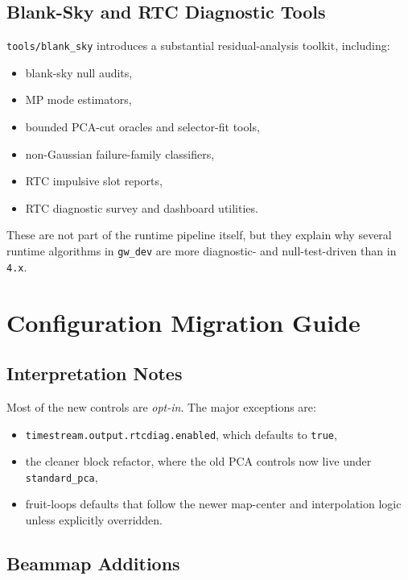 \documentclass[11pt]{article}
\begin{document}
\subsection{Blank-Sky and RTC Diagnostic Tools}

\texttt{tools/blank\_sky} introduces a substantial residual-analysis toolkit,
including:

\begin{itemize}[leftmargin=1.5em]
\item blank-sky null audits,
\item MP mode estimators,
\item bounded PCA-cut oracles and selector-fit tools,
\item non-Gaussian failure-family classifiers,
\item RTC impulsive slot reports,
\item RTC diagnostic survey and dashboard utilities.
\end{itemize}

These are not part of the runtime pipeline itself, but they explain why several
runtime algorithms in \texttt{gw\_dev} are more diagnostic- and null-test-driven
than in \texttt{4.x}.

\section{Configuration Migration Guide}

\subsection{Interpretation Notes}

Most of the new controls are \emph{opt-in}. The major exceptions are:

\begin{itemize}[leftmargin=1.5em]
\item \texttt{timestream.output.rtcdiag.enabled}, which defaults to
\texttt{true},
\item the cleaner block refactor, where the old PCA controls now live under
\texttt{standard\_pca},
\item fruit-loops defaults that follow the newer map-center and interpolation
logic unless explicitly overridden.
\end{itemize}

\subsection{Beammap Additions}
\end{document}
